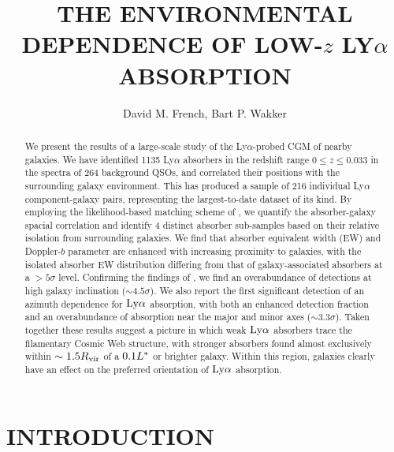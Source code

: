 \documentclass[twocolumn,tighten]{aastex62}
\begin{document}
\title{THE ENVIRONMENTAL DEPENDENCE OF LOW-$z$ LY$\alpha$ ABSORPTION}



\author{David M. French, Bart P. Wakker}


\begin{abstract}
We present the results of a large-scale study of the Ly$\alpha$-probed CGM of nearby galaxies. We have identified 1135 Ly$\alpha$ absorbers in the redshift range $0 \leq z \leq 0.033$ in the spectra of 264 background QSOs, and correlated their positions with the surrounding galaxy environment. This has produced a sample of 216 individual Ly$\alpha$ component-galaxy pairs, representing the largest-to-date dataset of its kind. By employing the likelihood-based matching scheme of \cite{french2017}, we quantify the absorber-galaxy spacial correlation and identify 4 distinct absorber sub-samples based on their relative isolation from surrounding galaxies. We find that absorber equivalent width (EW) and Doppler-$b$ parameter are enhanced with increasing proximity to galaxies, with the isolated absorber EW distribution differing from that of galaxy-associated absorbers at a $>5 \sigma$ level. Confirming the findings of \cite{french2017}, we find an overabundance of detections at high galaxy inclination ($\sim 4.5 \sigma$). We also report the first significant detection of an azimuth dependence for $\rm Ly\alpha$ absorption, with both an enhanced detection fraction and an overabundance of absorption near the major and minor axes ($\sim 3.3 \sigma$). Taken together these results suggest a picture in which weak $\rm Ly\alpha$ absorbers trace the filamentary Cosmic Web structure, with stronger absorbers found almost exclusively within $\sim 1.5 R_{\rm vir}$ of a $0.1 L^{\**}$ or brighter galaxy. Within this region, galaxies clearly have an effect on the preferred orientation of $\rm Ly\alpha$ absorption.

\end{abstract}




\section{INTRODUCTION}
\end{document}
